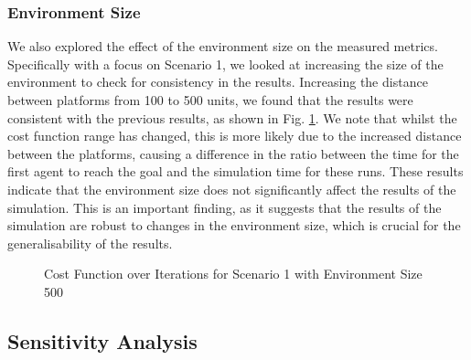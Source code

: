 \documentclass[12pt]{article}
\begin{document}
\subsubsection{Environment Size}
We also explored the effect of the environment size on the measured metrics. Specifically with a focus on Scenario 1, we looked at increasing the size of the environment to check for consistency in the results. Increasing the distance between platforms from 100 to 500 units, we found that the results were consistent with the previous results, as shown in Fig. \ref{fig:environment-size}. We note that whilst the cost function range has changed, this is more likely due to the increased distance between the platforms, causing a difference in the ratio between the time for the first agent to reach the goal and the simulation time for these runs. These results indicate that the environment size does not significantly affect the results of the simulation. This is an important finding, as it suggests that the results of the simulation are robust to changes in the environment size, which is crucial for the generalisability of the results.

\begin{figure}[ht]
    \centering
    \caption{Cost Function over Iterations for Scenario 1 with Environment Size 500}
    \label{fig:environment-size}
\end{figure}

\subsection{Sensitivity Analysis}
\end{document}
